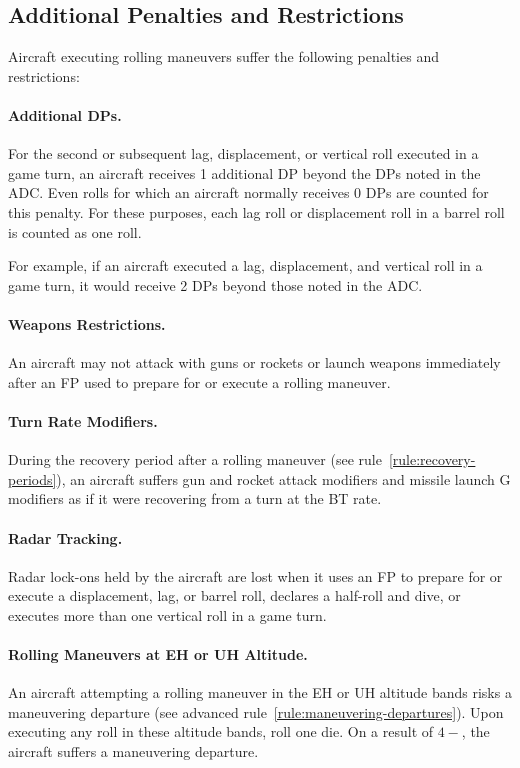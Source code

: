 {\subsection{Additional Penalties and Restrictions}

Aircraft executing rolling maneuvers suffer the following penalties and restrictions:

\paragraph{Additional DPs.} 
For the second or subsequent lag, displacement, or vertical roll executed in a game turn, an aircraft receives 1 additional DP beyond the DPs noted in the ADC. Even rolls for which an aircraft normally receives 0 DPs are counted for this penalty. For these purposes, each lag roll or displacement roll in a barrel roll is counted as one roll.

For example, if an aircraft executed a lag, displacement, and vertical roll in a game turn, it would receive 2 DPs beyond those noted in the ADC.

\paragraph{Weapons Restrictions.} An aircraft may not attack with guns or rockets or launch weapons immediately after an FP used to prepare for or execute a rolling maneuver.

\paragraph{Turn Rate Modifiers.} During the recovery period after a rolling maneuver (see rule~\ref{rule:recovery-periods}), an aircraft suffers gun and rocket attack modifiers and missile launch G modifiers as if it were recovering from a turn at the BT rate.

\paragraph{Radar Tracking.} Radar lock-ons held by the aircraft are lost when it uses an FP to prepare for or execute a displacement, lag, or barrel roll, declares a half-roll and dive, or executes more than one vertical roll in a game turn.

\paragraph{Rolling Maneuvers at EH or UH Altitude.} \label{rule:rolling-maneuvers-at-eh-or-uh-altitude} An aircraft attempting a rolling maneuver in the EH or UH altitude bands risks a maneuvering departure (see advanced rule~\ref{rule:maneuvering-departures}). Upon executing any roll in these altitude bands,  roll one die. On a result of $4-$, the aircraft suffers a maneuvering departure.
}

